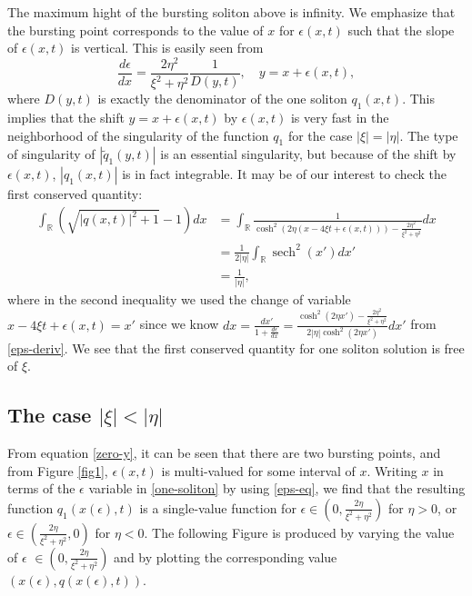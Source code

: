 \documentclass[11pt]{article}
\newcommand{\RR}{{\mathbb R}}
\DeclareMathOperator{\sech}{sech}
\begin{document}
The maximum hight of the bursting soliton above is infinity. We emphasize that the bursting point corresponds to the value of $x$ for $\epsilon(x,t)$ such that the slope of $\epsilon(x,t)$ is vertical. This is easily seen from  
\begin{equation}\label{eps-deriv}
\frac{d\epsilon}{dx}=\frac{2\eta^2}{\xi^2+\eta^2}\frac{1}{D(y,t)}, \quad y=x+\epsilon(x,t),
\end{equation}
where $D(y,t)$ is exactly the denominator of the one soliton $q_1(x,t)$.
This implies that the shift $y=x+\epsilon(x,t)$ by $\epsilon(x,t)$ is very fast in the neighborhood of the singularity of the function $q_1$ for the case $|\xi|=|\eta|$. The type of singularity of $|\tilde{q}_1(y,t)|$ is an essential singularity, but because of the shift by $\epsilon(x,t)$, $|q_1(x,t)|$ is in fact integrable. It may be of our interest to check the first conserved quantity: 
\begin{align*}
\int_{\RR}(\sqrt{|q(x,t)|^2+1}-1)dx &=\int_{\RR}\frac{1}{\cosh^2(2\eta(x-4\xi t+\epsilon(x,t)))-\frac{2\eta^2}{\xi^2+\eta^2}}dx \\
&=\frac{1}{2|\eta|}\int_{\RR}\sech^2(x')dx'\\
&=\frac{1}{|\eta|},
\end{align*}
where in the second inequality we used the change of variable $x-4\xi t +\epsilon(x,t)=x'$ since we know $dx=\frac{dx'}{1+\frac{d\epsilon}{dx}}=\frac{\cosh^2(2\eta x')-\frac{2\eta^2}{\xi^2+\eta^2}}{2|\eta| \cosh^2(2\eta x')}dx'$ from \eqref{eps-deriv}. We see that the first conserved quantity for one soliton solution is free of $\xi$.



\subsection{The case $|\xi|<|\eta|$} 
From equation \eqref{zero-y}, it can be seen that there are two bursting points, and from Figure \ref{fig1}, $\epsilon(x,t)$ is multi-valued for some interval of $x$. Writing $x$ in terms of the $\epsilon$ variable in \eqref{one-soliton} by using \eqref{eps-eq}, we find that the resulting function $q_1(x(\epsilon),t)$ is a single-value function for $\epsilon \in (0, \frac{2\eta}{\xi^2+\eta^2})$ for $\eta>0$, or  $\epsilon \in (\frac{2\eta}{\xi^2+\eta^2},0)$ for $\eta<0$. The following Figure is produced by varying the value of $\epsilon$ $\in (0, \frac{2\eta}{\xi^2+\eta^2})$ and by plotting the corresponding value $(x(\epsilon),q(x(\epsilon),t))$. 
 
\end{document}
